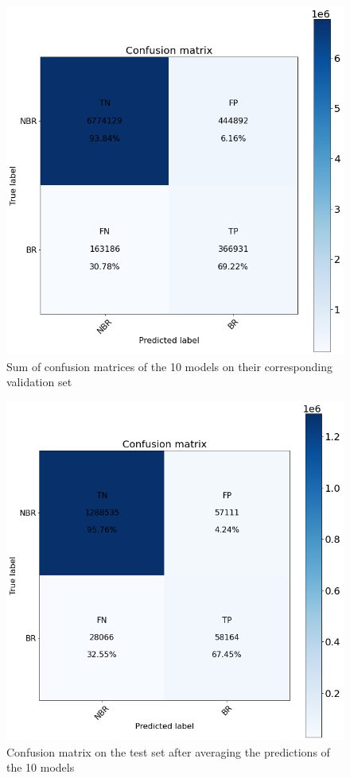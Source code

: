 \documentclass[journal=jacsat,manuscript=article]{achemso}
\begin{document}
\begin{figure}
    \centering
    \noindent\includegraphics[scale=0.4]{valid_cm.png}
    \caption{\centering Sum of confusion matrices of the 10 models on their corresponding validation set}
    \label{fig:valid_cm}
\end{figure}
\begin{figure}
    \centering
    \noindent\includegraphics[scale=0.4]{test_cm.png}
    \caption{\centering Confusion matrix on the test set after averaging the predictions of the 10 models}
    \label{fig:test_cm}
\end{figure}
\end{document}
